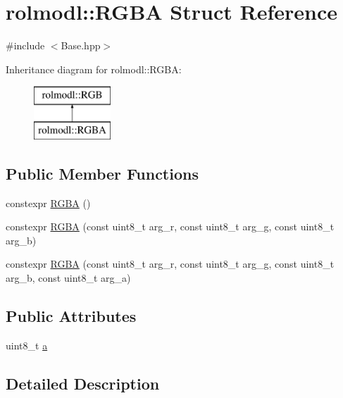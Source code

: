 \hypertarget{structrolmodl_1_1_r_g_b_a}{}\section{rolmodl\+::R\+G\+BA Struct Reference}
\label{structrolmodl_1_1_r_g_b_a}


{\ttfamily \#include $<$Base.\+hpp$>$}

Inheritance diagram for rolmodl\+::R\+G\+BA\+:\begin{figure}[H]
\begin{center}
\leavevmode
\includegraphics[height=2.000000cm]{structrolmodl_1_1_r_g_b_a}
\end{center}
\end{figure}
\subsection*{Public Member Functions}
\begin{DoxyCompactItemize}
\item 
constexpr \mbox{\hyperlink{structrolmodl_1_1_r_g_b_a_a1c5b50256730c9573d3e0a3deb6f6bd9}{R\+G\+BA}} ()
\item 
constexpr \mbox{\hyperlink{structrolmodl_1_1_r_g_b_a_aff6e831cd7ef85dccb5a56dde36b835e}{R\+G\+BA}} (const uint8\+\_\+t arg\+\_\+r, const uint8\+\_\+t arg\+\_\+g, const uint8\+\_\+t arg\+\_\+b)
\item 
constexpr \mbox{\hyperlink{structrolmodl_1_1_r_g_b_a_adda91fdd4ee346dcc19019c2ebdcf325}{R\+G\+BA}} (const uint8\+\_\+t arg\+\_\+r, const uint8\+\_\+t arg\+\_\+g, const uint8\+\_\+t arg\+\_\+b, const uint8\+\_\+t arg\+\_\+a)
\end{DoxyCompactItemize}
\subsection*{Public Attributes}
\begin{DoxyCompactItemize}
\item 
uint8\+\_\+t \mbox{\hyperlink{structrolmodl_1_1_r_g_b_a_ac0b2a99fa0fe7bbc949cf9907e512f07}{a}}
\end{DoxyCompactItemize}


\subsection{Detailed Description}


